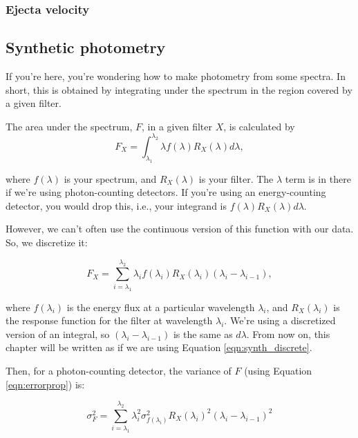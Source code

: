 \subsubsection{Ejecta velocity}
\label{sec:ejectavelocity}

\subsection{Synthetic photometry}

If you're here, you're wondering how to make photometry from some spectra. In short, this is obtained by integrating under the spectrum in the region covered by a given filter. 

The area under the spectrum, $F$, in a given filter $X$, is calculated by
\begin{equation}
    F_{X} = \int_{\lambda_{1}}^{\lambda_{2}} \lambda f(\lambda) R_{X}(\lambda) d\lambda,
\label{eqn:synthint}
\end{equation}

where $f(\lambda)$ is your spectrum, and $R_{X}(\lambda)$ is your filter. The $\lambda$ term is in there if we're using photon-counting detectors. If you're using an energy-counting detector, you would drop this, i.e., your integrand is $f(\lambda) R_{X}(\lambda) d\lambda$.

However, we can't often use the continuous version of this function with our data. So, we discretize it:

\begin{equation}
    F_{X} = \sum_{i=\lambda_{1}}^{\lambda_{2}} \lambda_{i} f(\lambda_{i}) R_{X}(\lambda_{i})(\lambda_{i} - \lambda_{i-1}),
\label{eqn:synth_discrete}
\end{equation}

where $f(\lambda_{i})$ is the energy flux at a particular wavelength $\lambda_{i}$, and $R_{X}(\lambda_{i})$ is the response function for the filter at wavelength $\lambda_{i}$. We're using a discretized version of an integral, so $(\lambda_{i} - \lambda_{i-1})$ is the same as $d\lambda$. From now on, this chapter will be written as if we are using Equation \ref{eqn:synth_discrete}.

Then, for a photon-counting detector, the variance of $F$ (using Equation \ref{eqn:errorprop}) is:

\begin{equation}
    \sigma_{F}^{2} = \sum_{i=\lambda_{1}}^{\lambda_{2}} \lambda_{i}^{2}\sigma_{f(\lambda_{i})}^{2} R_{X}(\lambda_{i})^{2}(\lambda_{i} - \lambda_{i-1})^{2}
\end{equation}

